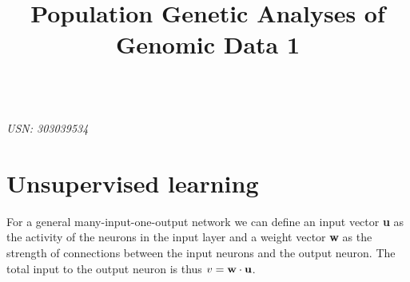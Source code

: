 \documentclass{article}
\title{Population Genetic Analyses of Genomic Data 1}
\begin{document}

\begin{center}
\textbf{\LARGE{}}\\

\textit{USN: 303039534}\\
\end{center}


\section{Unsupervised learning}

For a general many-input-one-output network we can define an input vector \textbf{u} as the activity of the neurons in the input layer and a weight vector \textbf{w} as the strength of connections between the input neurons and the output neuron. The total input to the output neuron is thus
$ v = \bf{w} \cdot \bf{u} $.
\end{document}
